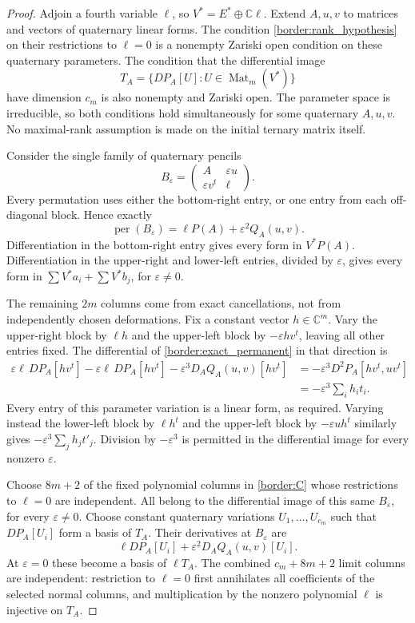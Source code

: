 \begin{proof}
Adjoin a fourth variable $\ell$, so $V^*=E^*\oplus\mathbb C\ell$.
Extend $A,u,v$ to matrices and vectors of quaternary linear forms.
The condition \eqref{border:rank_hypothesis} on their restrictions
to $\ell=0$ is a nonempty Zariski open condition on these
quaternary parameters. The condition that the differential image
\[
 T_A=\{DP_A[U]:U\in\operatorname{Mat}_m(V^*)\}
\]
have dimension $c_m$ is also nonempty and Zariski open. The
parameter space is irreducible, so both conditions hold
simultaneously for some quaternary $A,u,v$. No maximal-rank
assumption is made on the initial ternary matrix itself.

Consider the single family of quaternary pencils
\[
 B_\varepsilon=
 \begin{pmatrix}A&\varepsilon u\\
                 \varepsilon v^t&\ell\end{pmatrix}.
\]
Every permutation uses either the bottom-right entry, or one
entry from each off-diagonal block. Hence exactly
\begin{equation}\label{border:exact_permanent}
 \operatorname{per}(B_\varepsilon)
       =\ell P(A)+\varepsilon^2Q_A(u,v).
\end{equation}
Differentiation in the bottom-right entry gives every form in
$V^*P(A)$. Differentiation in the upper-right and lower-left
entries, divided by $\varepsilon$, gives every form in
$\sum V^*a_i+\sum V^*b_j$, for $\varepsilon\ne0$.

The remaining $2m$ columns come from exact cancellations, not
from independently chosen deformations. Fix a constant vector
$h\in\mathbb C^m$. Vary the upper-right block by $\ell h$ and
the upper-left block by $-\varepsilon hv^t$, leaving all other
entries fixed. The differential of
\eqref{border:exact_permanent} in that direction is
\begin{align*}
 \varepsilon\ell\,DP_A[hv^t]
  -\varepsilon\ell\,DP_A[hv^t]
  -\varepsilon^3D_AQ_A(u,v)[hv^t]
   &=-\varepsilon^3D^2P_A[hv^t,uv^t]\\
   &=-\varepsilon^3\sum_i h_it_i.
\end{align*}
Every entry of this parameter variation is a linear form, as
required. Varying instead the lower-left block by $\ell h^t$
and the upper-left block by $-\varepsilon uh^t$ similarly gives
$-\varepsilon^3\sum_jh_jt'_j$. Division by
$-\varepsilon^3$ is permitted in the differential image for
every nonzero $\varepsilon$.

Choose $8m+2$ of the fixed polynomial columns in
\eqref{border:C} whose restrictions to $\ell=0$ are independent.
All belong to the differential image of this same
$B_\varepsilon$, for every $\varepsilon\ne0$.
Choose constant quaternary variations $U_1,\ldots,U_{c_m}$ such
that $DP_A[U_i]$ form a basis of $T_A$. Their derivatives at
$B_\varepsilon$ are
\[
 \ell DP_A[U_i]+\varepsilon^2D_AQ_A(u,v)[U_i].
\]
At $\varepsilon=0$ these become a basis of $\ell T_A$.
The combined $c_m+8m+2$ limit columns are independent: restriction
to $\ell=0$ first annihilates all coefficients of the selected
normal columns, and multiplication by the nonzero polynomial
$\ell$ is injective on $T_A$.


\end{proof}
